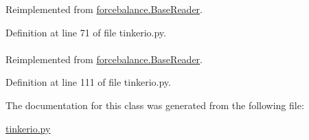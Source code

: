 \-Reimplemented from \hyperlink{classforcebalance_1_1BaseReader_aaf18c900d6055ed4b5124f6bb26164c1}{forcebalance.\-Base\-Reader}.



\-Definition at line 71 of file tinkerio.\-py.

\hypertarget{classforcebalance_1_1tinkerio_1_1Tinker__Reader_a7078ca5338dff178edf5afb05a1f32c8}{
\paragraph[{suffix}]{}}\label{classforcebalance_1_1tinkerio_1_1Tinker__Reader_a7078ca5338dff178edf5afb05a1f32c8}


\-Reimplemented from \hyperlink{classforcebalance_1_1BaseReader_a48ef0584a1b6b4b6f8eb741ad8465db8}{forcebalance.\-Base\-Reader}.



\-Definition at line 111 of file tinkerio.\-py.



\-The documentation for this class was generated from the following file\-:\begin{DoxyCompactItemize}
\item 
\hyperlink{tinkerio_8py}{tinkerio.\-py}\end{DoxyCompactItemize}
